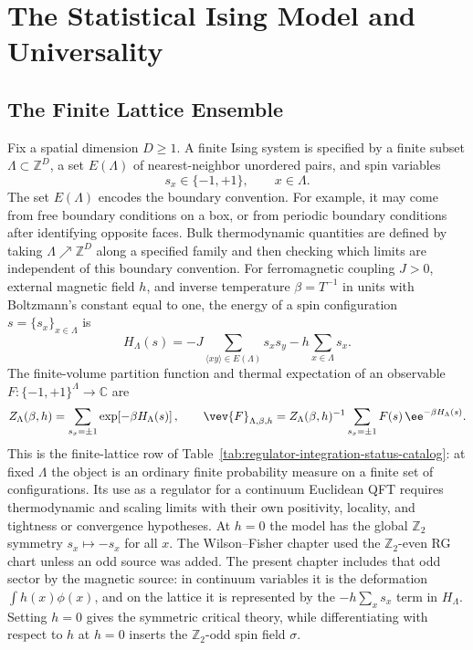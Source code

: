 \chapter{The Statistical Ising Model and Universality}
\label{ch:volume-ii-ising-universality}
\ConventionsEuclidean

\label{ch:ising-universality}

\section{The Finite Lattice Ensemble}

Fix a spatial dimension \(D\geq 1\).  A finite Ising system is specified by a
finite subset \(\Lambda\subset \mathbb Z^D\), a set \(E(\Lambda)\) of
nearest-neighbor unordered pairs, and spin variables
\[
  s_x\in\{-1,+1\},
  \qquad x\in\Lambda .
\]
The set \(E(\Lambda)\) encodes the boundary convention.  For example, it may
come from free boundary conditions on a box, or from periodic boundary
conditions after identifying opposite faces.  Bulk thermodynamic quantities are
defined by taking \(\Lambda\nearrow\mathbb Z^D\) along a specified family and
then checking which limits are independent of this boundary convention.
For ferromagnetic coupling \(J>0\), external magnetic field \(h\), and inverse
temperature \(\beta=T^{-1}\) in units with Boltzmann's constant equal to one,
the energy of a spin configuration \(s=\{s_x\}_{x\in\Lambda}\) is
\[
  H_\Lambda(s)
  =
  -J\sum_{\langle x y\rangle\in E(\Lambda)}s_xs_y
  -h\sum_{x\in\Lambda}s_x .
\]
The finite-volume partition function and thermal expectation of an observable
\(F:\{-1,+1\}^{\Lambda}\to\mathbb C\) are
\[
  Z_\Lambda(\beta,h)
  =
  \sum_{s_x=\pm1}
  \exp\!\left[-\beta H_\Lambda(s)\right],
  \qquad
  \vev{F}_{\Lambda,\beta,h}
  =
  Z_\Lambda(\beta,h)^{-1}
  \sum_{s_x=\pm1}F(s)\,\ee^{-\beta H_\Lambda(s)} .
\]
This is the finite-lattice row of
Table~\ref{tab:regulator-integration-status-catalog}: at fixed
\(\Lambda\) the object is an ordinary finite probability measure on a finite
set of configurations.  Its use as a regulator for a continuum Euclidean QFT
requires thermodynamic and scaling limits with their own positivity,
locality, and tightness or convergence hypotheses.
At \(h=0\) the model has the global \(\mathbb Z_2\) symmetry
\(s_x\mapsto -s_x\) for all \(x\).
The Wilson--Fisher chapter used the \(\mathbb Z_2\)-even RG chart unless an
odd source was added.  The present chapter includes that odd sector by the
magnetic source: in continuum variables it is the deformation
\(\int h(x)\phi(x)\), and on the lattice it is represented by the
\(-h\sum_x s_x\) term in \(H_\Lambda\).  Setting \(h=0\) gives the symmetric
critical theory, while differentiating with respect to \(h\) at \(h=0\)
inserts the \(\mathbb Z_2\)-odd spin field \(\sigma\).

